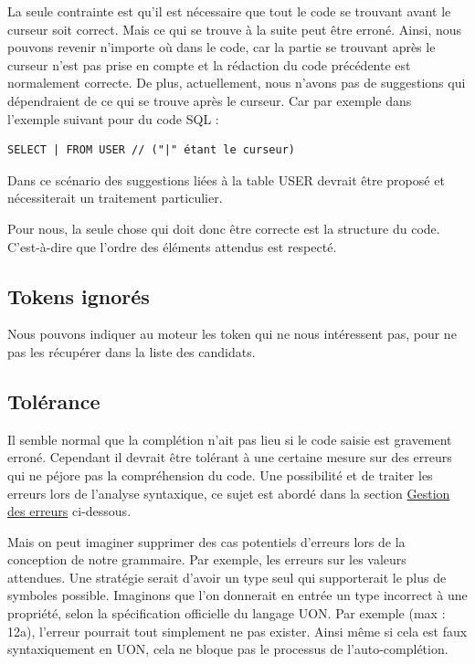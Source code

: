 \documentclass[
    iict, %
    il, %
]{heig-tb}
\begin{document}
La seule contrainte est qu'il est nécessaire que tout le code se trouvant avant le curseur soit correct. Mais ce qui se trouve à la suite peut être erroné.
Ainsi, nous pouvons revenir n'importe où dans le code, car la partie se trouvant après le curseur n'est pas prise en compte et la rédaction du code précédente est normalement correcte.
De plus, actuellement, nous n'avons pas de suggestions qui dépendraient de ce qui se trouve après le curseur.
Car par exemple dans l'exemple suivant pour du code SQL :

\begin{lstlisting}[frame=single]
SELECT | FROM USER // ("|" étant le curseur)
\end{lstlisting}

Dans ce scénario des suggestions liées à la table USER devrait être proposé et nécessiterait un traitement particulier.

Pour nous, la seule chose qui doit donc être correcte est la structure du code. C'est-à-dire que l'ordre des éléments attendus est respecté.

\subsection{Tokens ignorés}
Nous pouvons indiquer au moteur les token qui ne nous intéressent pas, pour ne pas les récupérer dans la liste des candidats.

\subsection{Tolérance}
Il semble normal que la complétion n'ait pas lieu si le code saisie est gravement erroné.
Cependant il devrait être tolérant à une certaine mesure sur des erreurs qui ne péjore pas la compréhension du code.
Une possibilité et de traiter les erreurs lors de l'analyse syntaxique, ce sujet est abordé dans la section \hyperref[error handle]{Gestion des erreurs} ci-dessous.

Mais on peut imaginer supprimer des cas potentiels d'erreurs lors de la conception de notre grammaire.
Par exemple, les erreurs sur les valeurs attendues. Une stratégie serait d'avoir un type seul qui supporterait le plus de symboles possible.
Imaginons que l'on donnerait en entrée un type incorrect à une propriété, selon la spécification officielle du langage UON.
Par exemple (max : 12a), l'erreur pourrait tout simplement ne pas exister.
Ainsi même si cela est faux syntaxiquement en UON, cela ne bloque pas le processus de l'auto-complétion.
\end{document}
